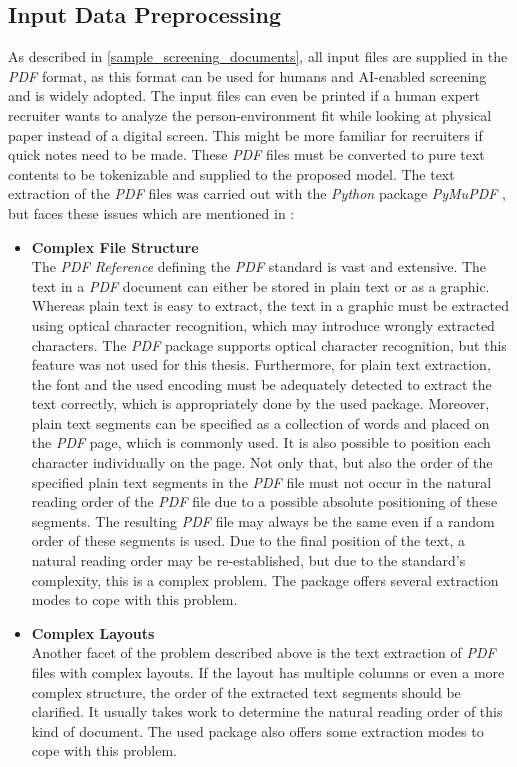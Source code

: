 \documentclass[draft,final]{thesisclass} %
\begin{document}
\subsection{Input Data Preprocessing}
As described in \ref{sample_screening_documents}, all input files are supplied in the \textit{PDF} format, as this format can be used for humans and \acs{AI}-enabled screening and is widely adopted.
The input files can even be printed if a human expert recruiter wants to analyze the person-environment fit while looking at physical paper instead of a digital screen.
This might be more familiar for recruiters if quick notes need to be made.
These \textit{PDF} files must be converted to pure text contents to be tokenizable and supplied to the proposed model.
The text extraction of the \textit{PDF} files was carried out with the \textit{Python} package \textit{PyMuPDF} \parencite{pymupdf}, but faces these issues which are mentioned in \textcite{pymupdf}:
\begin{itemize}
    \item \textbf{Complex File Structure}\\
    The \textit{PDF Reference} defining the \textit{PDF} standard is vast and extensive. 
    The text in a \textit{PDF} document can either be stored in plain text or as a graphic.
    Whereas plain text is easy to extract, the text in a graphic must be extracted using optical character recognition, which may introduce wrongly extracted characters. 
    The \textit{PDF} package supports optical character recognition, but this feature was not used for this thesis.
    Furthermore, for plain text extraction, the font and the used encoding must be adequately detected to extract the text correctly, which is appropriately done by the used package.
    Moreover, plain text segments can be specified as a collection of words and placed on the \textit{PDF} page, which is commonly used. 
    It is also possible to position each character individually on the page.
    Not only that, but also the order of the specified plain text segments in the \textit{PDF} file must not occur in the natural reading order of the \textit{PDF} file due to a possible absolute positioning of these segments. The resulting \textit{PDF} file may always be the same even if a random order of these segments is used.
    Due to the final position of the text, a natural reading order may be re-established, but due to the standard's complexity, this is a complex problem. 
    The package offers several extraction modes to cope with this problem.
    \item \textbf{Complex Layouts}\\
    Another facet of the problem described above is the text extraction of \textit{PDF} files with complex layouts.
    If the layout has multiple columns or even a more complex structure, the order of the extracted text segments should be clarified. 
    It usually takes work to determine the natural reading order of this kind of document.
    The used package also offers some extraction modes to cope with this problem.
\end{itemize}
\end{document}

